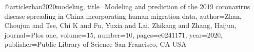 @article{zhan2020modeling,
  title={Modeling and prediction of the 2019 coronavirus disease spreading in China incorporating human migration data},
  author={Zhan, Choujun and Tse, Chi K and Fu, Yuxia and Lai, Zhikang and Zhang, Haijun},
  journal={Plos one},
  volume={15},
  number={10},
  pages={e0241171},
  year={2020},
  publisher={Public Library of Science San Francisco, CA USA}
}